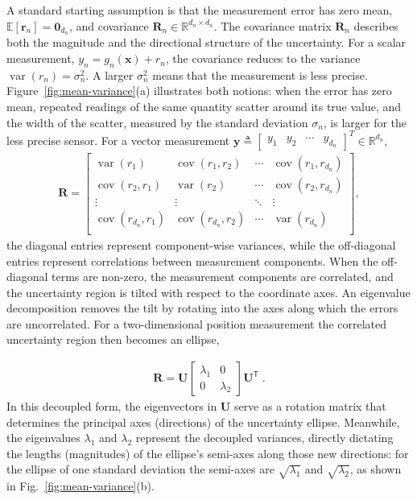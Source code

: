 \documentclass[graybox,envcountchap]{style/SNmono}
\begin{document}
A standard starting assumption is that the measurement error has zero mean, $\mathbb{E}[\mathbf{r}_n]=\mathbf{0}_{d_n}$, and covariance $\mathbf{R}_n\in\mathbb{R}^{d_n\times d_n}$. The covariance matrix $\mathbf{R}_n$ describes both the magnitude and the directional structure of the uncertainty. For a scalar measurement, $y_n=g_n(\mathbf{x})+r_n$, the covariance reduces to the variance $\operatorname{var}(r_n)=\sigma_n^2$. A larger $\sigma_n^2$ means that the measurement is less precise. Figure~\ref{fig:mean-variance}(a) illustrates both notions: when the error has zero mean, repeated readings of the same quantity scatter around its true value, and the width of the scatter, measured by the standard deviation $\sigma_n$, is larger for the less precise sensor. For a vector measurement $\mathbf{y}\triangleq \begin{bmatrix} y_{1} & y_{2} & \cdots & y_{d_n} \end{bmatrix}^T \in \mathbb{R}^{d_n}$,
\begin{align*}
\mathbf{R}=
\begin{bmatrix}
\operatorname{var}(r_{1}) & \operatorname{cov}(r_{1},r_{2}) & \cdots & \operatorname{cov}(r_{1},r_{d_n})\\
\operatorname{cov}(r_{2},r_{1}) & \operatorname{var}(r_{2}) & \cdots & \operatorname{cov}(r_{2},r_{d_n}) \\
\vdots & \vdots & \ddots & \vdots\\
\operatorname{cov}(r_{d_n},r_{1})  & \operatorname{cov}(r_{d_n},r_{2}) & \cdots & \operatorname{var}(r_{d_n}) \\
\end{bmatrix},
\end{align*}
the diagonal entries represent component-wise variances, while the off-diagonal entries represent correlations between measurement components. When the off-diagonal terms are non-zero, the measurement components are correlated, and the uncertainty region is tilted with respect to the coordinate axes. An eigenvalue decomposition removes the tilt by rotating into the axes along which the errors are uncorrelated. For a two-dimensional position measurement
the correlated uncertainty region then becomes an ellipse,

\begin{align*}
\mathbf{R}=\mathbf{U}\left[\begin{matrix}\lambda _{1}&0\\ 0&\lambda _{2}\end{matrix}\right]\mathbf{U}^{\mathsf{T}} \;.
\end{align*}
In this decoupled form, the eigenvectors in $\mathbf{U}$ serve as a rotation matrix that determines the principal axes (directions) of the uncertainty ellipse. Meanwhile, the eigenvalues $\lambda _{1}$ and $\lambda _{2}$ represent the decoupled variances, directly dictating the lengths (magnitudes) of the ellipse's semi-axes along those new directions: for the ellipse of one standard deviation the semi-axes are $\sqrt{\lambda_1}$ and $\sqrt{\lambda_2}$, as shown in Fig.~\ref{fig:mean-variance}(b).
\end{document}
